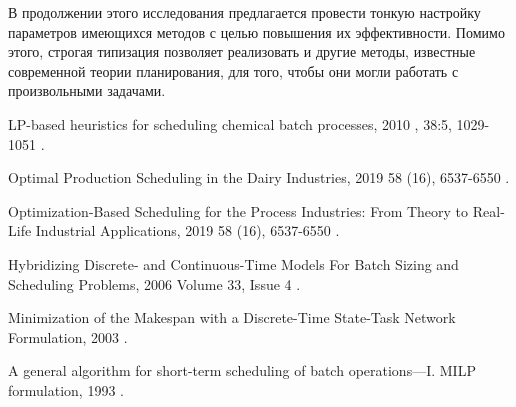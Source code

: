 \documentclass[12pt, twoside]{article}
\theoremstyle{definition}
\begin{document}
В продолжении этого исследования предлагается провести тонкую настройку параметров имеющихся методов с целью повышения их эффективности. Помимо этого, строгая типизация позволяет реализовать и другие методы, известные современной теории планирования, для того, чтобы они могли работать с произвольными задачами.

\begin{thebibliography}{99}

    LP-based heuristics for scheduling chemical batch processes, 2010
    , 38:5, 1029-1051
	.

    Optimal Production Scheduling in the Dairy Industries, 2019
     58 (16), 6537-6550
	.
	
    Optimization-Based Scheduling for the Process Industries: From Theory to Real-Life Industrial Applications, 2019
     58 (16), 6537-6550
	.
	
    Hybridizing Discrete- and Continuous-Time Models For Batch Sizing and
Scheduling Problems, 2006
     Volume 33, Issue 4
	.
	
    Minimization of the Makespan with a Discrete-Time State-Task Network Formulation, 2003
	.
	
    A general algorithm for short-term scheduling of batch operations—I. MILP formulation, 1993
	.
	

\end{thebibliography}
\end{document}
